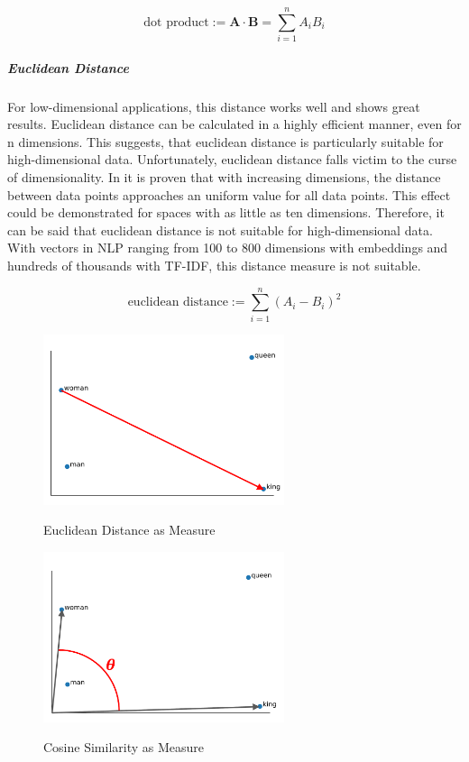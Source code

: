 					\[ 
				\text{dot product} :=  \mathbf{A} \cdot \mathbf{B}= \sum\limits_{i=1}^{n}{A_i  B_i} 
				\]

	
		\subparagraph{Euclidean Distance} \label{euclidean}
		For low-dimensional applications, this distance works well and shows great results. Euclidean distance can be calculated in a highly efficient manner, even for n dimensions. This suggests, that euclidean distance is particularly suitable for high-dimensional data. Unfortunately, euclidean distance falls victim to the curse of dimensionality. In \cite[p.~1]{beyerNearestNeighbor} it is proven that with increasing dimensions, the distance between data points approaches an uniform value for all data points. This effect could be demonstrated for spaces with as little as ten dimensions. Therefore, it can be said that euclidean distance is not suitable for high-dimensional data. With vectors in \ac{NLP} ranging from 100 to 800 dimensions with embeddings and hundreds of thousands with \ac{TF-IDF}, this distance measure is not suitable.
		
				\[ 
		\text{euclidean distance} :=  \sum\limits_{i=1}^{n}{(A_i -  B_i)^{2}} 
		\]
		
		\begin{figure} 
			\begin{minipage}{0.49\textwidth}
				\label{fig:euclidean}
				
				\includegraphics[height=5cm]{Bilder/models/euclidean}
				\caption{Euclidean Distance as Measure}
			\end{minipage}
			\hfill
			\begin{minipage}{0.49\textwidth}
				\label{fig:cosine}
				\includegraphics[height=5cm]{Bilder/models/cosine}
				\caption{Cosine Similarity as Measure}
			\end{minipage}
			\hfill
		\end{figure} 
	
